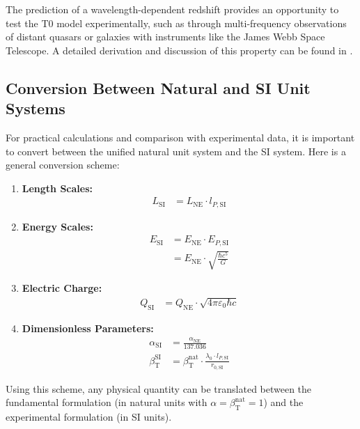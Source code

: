 \documentclass[12pt,a4paper]{article}
\newcommand{\betaT}{\beta_{\text{T}}}
\begin{document}
	The prediction of a wavelength-dependent redshift provides an opportunity to test the T0 model experimentally, such as through multi-frequency observations of distant quasars or galaxies with instruments like the James Webb Space Telescope. A detailed derivation and discussion of this property can be found in \cite{pascher_emergente_gravitation_2025}.
	
	\subsection{Conversion Between Natural and SI Unit Systems}
	
	For practical calculations and comparison with experimental data, it is important to convert between the unified natural unit system and the SI system. Here is a general conversion scheme:
	
	\begin{tcolorbox}[colback=blue!5!white,colframe=blue!75!black,title=Conversion Scheme for Natural and SI Units]
		\begin{enumerate}
			\item \textbf{Length Scales:}
			\begin{align}
				L_{\text{SI}} &= L_{\text{NE}} \cdot l_{P,\text{SI}}
			\end{align}
			\item \textbf{Energy Scales:}
			\begin{align}
				E_{\text{SI}} &= E_{\text{NE}} \cdot E_{P,\text{SI}} \\
				&= E_{\text{NE}} \cdot \sqrt{\frac{\hbar c^5}{G}}
			\end{align}
			\item \textbf{Electric Charge:}
			\begin{align}
				Q_{\text{SI}} &= Q_{\text{NE}} \cdot \sqrt{4\pi\varepsilon_0 \hbar c}
			\end{align}
			\item \textbf{Dimensionless Parameters:}
			\begin{align}
				\alpha_{\text{SI}} &= \frac{\alpha_{\text{NE}}}{137.036} \\
				\betaT^{\text{SI}} &= \betaT^{\text{nat}} \cdot \frac{\lambda_0 \cdot l_{P,\text{SI}}}{r_{0,\text{SI}}}
			\end{align}
		\end{enumerate}
	\end{tcolorbox}
	
	Using this scheme, any physical quantity can be translated between the fundamental formulation (in natural units with \(\alpha = \betaT^{\text{nat}} = 1\)) and the experimental formulation (in SI units).
	
\end{document}
